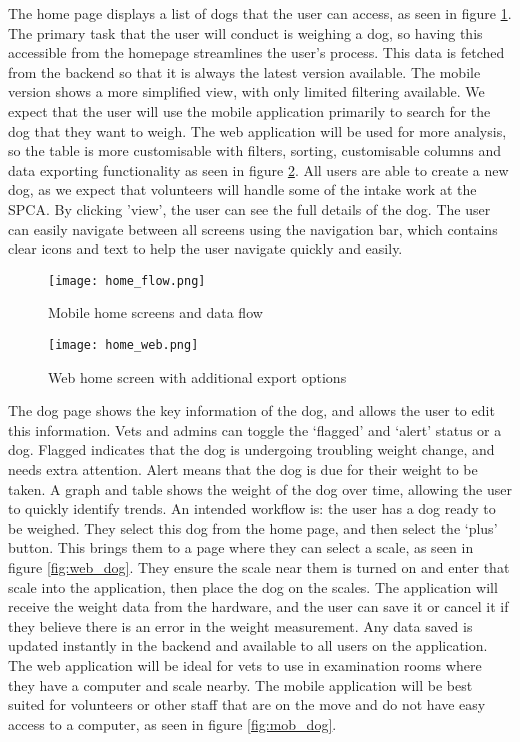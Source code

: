 The home page displays a list of dogs that the user can access, as seen in figure \ref{fig:mob_home}. The primary task that the user will conduct is weighing a dog, so having this accessible from the homepage streamlines the user's process. This data is fetched from the backend so that it is always the latest version available. The mobile version shows a more simplified view, with only limited filtering available. We expect that the user will use the mobile application primarily to search for the dog that they want to weigh. The web application will be used for more analysis, so the table is more customisable with filters, sorting, customisable columns and data exporting functionality as seen in figure \ref{fig:web_home}. All users are able to create a new dog, as we expect that volunteers will handle some of the intake work at the SPCA. By clicking 'view', the user can see the full details of the dog. The user can easily navigate between all screens using the navigation bar, which contains clear icons and text to help the user navigate quickly and easily.

\begin{figure}[!ht]
    \centering
    \texttt{[image: home\_flow.png]}
    \caption{Mobile home screens and data flow}
    \label{fig:mob_home}
\end{figure}

\begin{figure}[!ht]
    \centering
    \texttt{[image: home\_web.png]}
    \caption{Web home screen with additional export options}
    \label{fig:web_home}
\end{figure}

The dog page shows the key information of the dog, and allows the user to edit this information. Vets and admins can toggle the ‘flagged’ and ‘alert’ status or a dog. Flagged indicates that the dog is undergoing troubling weight change, and needs extra attention. Alert means that the dog is due for their weight to be taken. A graph and table shows the weight of the dog over time, allowing the user to quickly identify trends. An intended workflow is: the user has a dog ready to be weighed. They select this dog from the home page, and then select the ‘plus’ button. This brings them to a page where they can select a scale, as seen in figure \ref{fig:web_dog}. They ensure the scale near them is turned on and enter that scale into the application, then place the dog on the scales. The application will receive the weight data from the hardware, and the user can save it or cancel it if they believe there is an error in the weight measurement. Any data saved is updated instantly in the backend and available to all users on the application. The web application will be ideal for vets to use in examination rooms where they have a computer and scale nearby. The mobile application will be best suited for volunteers or other staff that are on the move and do not have easy access to a computer, as seen in figure \ref{fig:mob_dog}. 

